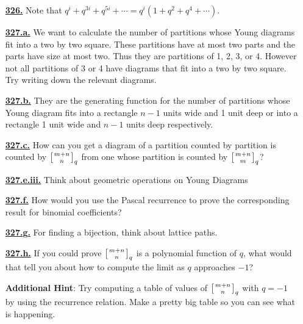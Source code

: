 \documentclass[10pt,]{book}
\theoremstyle{plain}
\theoremstyle{definition}
\theoremstyle{definition}
\theoremstyle{definition}
\numberwithin{equation}{chapter}
\newcommand{\qchoose}[2]{\left[{#1\atop#2}\right]_q}
\begin{document}
\begin{itemize}[itemsep=1em]
\hypertarget{a-326}{}\item[\textbf{\hyperref[activity-319]{326.}}]
\hypertarget{p-1614}{}%
Note that \(q^i + q^{3i} + q^{5i} + \cdots = q^i (1 + q^2 + q^4 + \cdots)\).%

\hypertarget{a-327.a}{}\item[\textbf{\hyperref[task-281]{327.a.}}]
\hypertarget{p-1618}{}%
We want to calculate the number of partitions whose Young diagrams fit into a two by two square. These partitions have at most two parts and the parts have size at most two. Thus they are partitions of 1, 2, 3, or 4. However not all partitions of 3 or 4 have diagrams that fit into a two by two square. Try writing down the relevant diagrams.%

\hypertarget{a-327.b}{}\item[\textbf{\hyperref[task-282]{327.b.}}]
\hypertarget{p-1621}{}%
They are the generating function for the number of partitions whose Young diagram fits into a rectangle \(n - 1\) units wide and 1 unit deep or into a rectangle 1 unit wide and \(n - 1\) units deep respectively.%

\hypertarget{a-327.c}{}\item[\textbf{\hyperref[task-283]{327.c.}}]
\hypertarget{p-1624}{}%
How can you get a diagram of a partition counted by partition is counted by \(\qchoose{m+n}{n}\) from one whose partition is counted by \(\qchoose{m+n}{m}\)?%

\hypertarget{a-327.e.iii}{}\item[\textbf{\hyperref[task-288]{327.e.iii.}}]
\hypertarget{p-1636}{}%
Think about geometric operations on Young Diagrams%

\hypertarget{a-327.f}{}\item[\textbf{\hyperref[task-289]{327.f.}}]
\hypertarget{p-1639}{}%
How would you use the Pascal recurrence to prove the corresponding result for binomial coefficients?%

\hypertarget{a-327.g}{}\item[\textbf{\hyperref[task-290]{327.g.}}]
\hypertarget{p-1643}{}%
For finding a bijection, think about lattice paths.%

\hypertarget{a-327.h}{}\item[\textbf{\hyperref[task-291]{327.h.}}]
\hypertarget{p-1646}{}%
If you could prove \(\qchoose{m+n}{n}\) is a polynomial function of \(q\), what would that tell you about how to compute the limit as \(q\) approaches \(-1\)?%

\par\smallskip
\noindent\textbf{Additional Hint}: \hypertarget{p-1647}{}%
Try computing a table of values of \(\qchoose{m+n}{n}\) with \(q=-1\) by using the recurrence relation. Make a pretty big table so you can see what is happening.%

\end{itemize}
\typeout{************************************************}
\typeout{************************************************}
\end{document}
